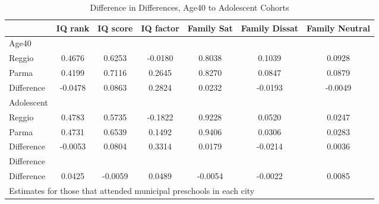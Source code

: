 \begin{table}[htbp]\centering
\caption{Difference in Differences, Age40 to Adolescent Cohorts}
\begin{tabular}{l*{6}{c}}
\hline\hline
            &     IQ rank&    IQ score&   IQ factor&  Family Sat&Family Dissat&Family Neutral\\
\hline
Age40       &            &            &            &            &            &            \\
Reggio      &      0.4676&      0.6253&     -0.0180&      0.8038&      0.1039&      0.0928\\
Parma       &      0.4199&      0.7116&      0.2645&      0.8270&      0.0847&      0.0879\\
Difference  &     -0.0478&      0.0863&      0.2824&      0.0232&     -0.0193&     -0.0049\\
\hline
Adolescent  &            &            &            &            &            &            \\
Reggio      &      0.4783&      0.5735&     -0.1822&      0.9228&      0.0520&      0.0247\\
Parma       &      0.4731&      0.6539&      0.1492&      0.9406&      0.0306&      0.0283\\
Difference  &     -0.0053&      0.0804&      0.3314&      0.0179&     -0.0214&      0.0036\\
\hline
Difference  &            &            &            &            &            &            \\
Difference  &      0.0425&     -0.0059&      0.0489&     -0.0054&     -0.0022&      0.0085\\
\hline\hline
\multicolumn{7}{l}{\footnotesize Estimates for those that attended municipal preschools in each city}\\
\end{tabular}
\end{table}
